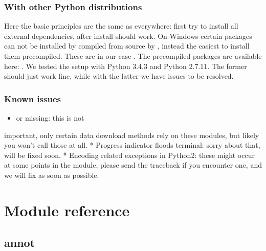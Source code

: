 \documentclass[letterpaper,10pt,english]{sphinxmanual}
\begin{document}
\subsection{With other Python distributions}
\label{\detokenize{installation:with-other-python-distributions}}
Here the basic principles are the same as everywhere: first try to install all
external dependencies, after  install should work. On Windows certain
packages can not be installed by compiled from source by , instead the
easiest to install them precompiled. These are in our case . The
precompiled packages are available here:
. We tested the setup with Python
3.4.3 and Python 2.7.11. The former should just work fine, while with the
latter we have issues to be resolved.


\subsection{Known issues}
\label{\detokenize{installation:known-issues}}\begin{itemize}
\item {} 
 \textendash{} or  missing: this is not

\end{itemize}

important, only certain data download methods rely on these modules, but
likely you won’t call those at all.
* Progress indicator floods terminal: sorry about that, will be fixed soon.
* Encoding related exceptions in Python2: these might occur at some points in
the module, please send the traceback if you encounter one, and we will fix
as soon as possible.



\chapter{Module reference}
\label{\detokenize{reference:module-reference}}\label{\detokenize{reference::doc}}

\section{annot}
\label{\detokenize{reference:module-pypath.annot}}\label{\detokenize{reference:annot}}
\end{document}
